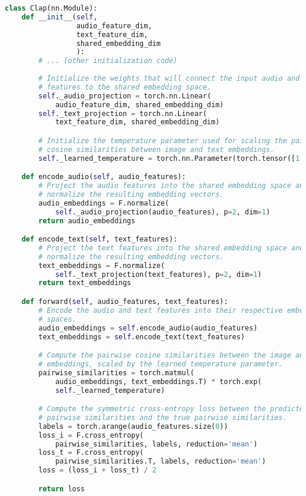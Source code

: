 \begin{lstlisting}[language=Python, caption={CLAP model architecture for joint audio-text embeddings with pairwise cosine similarity-based alignment.}]
class Clap(nn.Module):
    def __init__(self,
                 audio_feature_dim,
                 text_feature_dim,
                 shared_embedding_dim
                 ):
        # ... (other initialization code)
  
        # Initialize the weights that will connect the input audio and text
        # features to the shared embedding space.
        self._audio_projection = torch.nn.Linear(
            audio_feature_dim, shared_embedding_dim)
        self._text_projection = torch.nn.Linear(
            text_feature_dim, shared_embedding_dim)

        # Initialize the temperature parameter used for scaling the pairwise
        # cosine similarities between image and text embeddings.
        self._learned_temperature = torch.nn.Parameter(torch.tensor([1.0]))

    def encode_audio(self, audio_features):
        # Project the audio features into the shared embedding space and
        # normalize the resulting embedding vectors.
        audio_embeddings = F.normalize(
            self._audio_projection(audio_features), p=2, dim=1)
        return audio_embeddings

    def encode_text(self, text_features):
        # Project the text features into the shared embedding space and
        # normalize the resulting embedding vectors.
        text_embeddings = F.normalize(
            self._text_projection(text_features), p=2, dim=1)
        return text_embeddings

    def forward(self, audio_features, text_features):
        # Encode the audio and text features into their respective embedding
        # spaces.
        audio_embeddings = self.encode_audio(audio_features)
        text_embeddings = self.encode_text(text_features)

        # Compute the pairwise cosine similarities between the image and text
        # embeddings, scaled by the learned temperature parameter.
        pairwise_similarities = torch.matmul(
            audio_embeddings, text_embeddings.T) * torch.exp(
            self._learned_temperature)

        # Compute the symmetric cross-entropy loss between the predicted
        # pairwise similarities and the true pairwise similarities.
        labels = torch.arange(audio_features.size(0))
        loss_i = F.cross_entropy(
            pairwise_similarities, labels, reduction='mean')
        loss_t = F.cross_entropy(
            pairwise_similarities.T, labels, reduction='mean')
        loss = (loss_i + loss_t) / 2

        return loss
\end{lstlisting}


